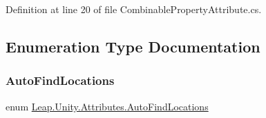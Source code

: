 Definition at line 20 of file Combinable\+Property\+Attribute.\+cs.



\subsection{Enumeration Type Documentation}
\mbox{\label{namespace_leap_1_1_unity_1_1_attributes_a4b8f0ac9a7b74b480178dc5fb4069a89}} 
\subsubsection{\texorpdfstring{AutoFindLocations}{AutoFindLocations}}
{\footnotesize\ttfamily enum \mbox{\hyperlink{namespace_leap_1_1_unity_1_1_attributes_a4b8f0ac9a7b74b480178dc5fb4069a89}{Leap.\+Unity.\+Attributes.\+Auto\+Find\+Locations}}\hspace{0.3cm}{\ttfamily [strong]}}

